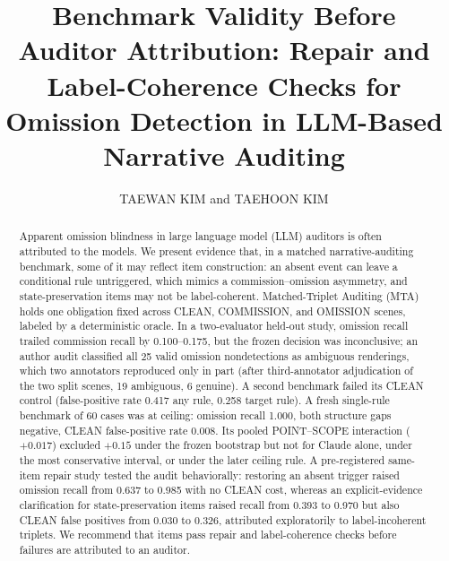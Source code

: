 \documentclass{ieeeaccess}
\begin{document}
\history{}
\doi{}
\title{Benchmark Validity Before Auditor Attribution: Repair and Label-Coherence Checks for Omission Detection in LLM-Based Narrative Auditing}
\author{\uppercase{Taewan Kim} and \uppercase{Taehoon Kim}}
\address[1]{Graduate School of Virtual Convergence, Sogang University, Seoul 04107, Republic of Korea}

\begin{abstract}
Apparent omission blindness in large language model (LLM) auditors is often attributed to the models. We present evidence that, in a matched narrative-auditing benchmark, some of it may reflect item construction: an absent event can leave a conditional rule untriggered, which mimics a commission--omission asymmetry, and state-preservation items may not be label-coherent. Matched-Triplet Auditing (MTA) holds one obligation fixed across CLEAN, COMMISSION, and OMISSION scenes, labeled by a deterministic oracle. In a two-evaluator held-out study, omission recall trailed commission recall by 0.100--0.175, but the frozen decision was inconclusive; an author audit classified all 25 valid omission nondetections as ambiguous renderings, which two annotators reproduced only in part (after third-annotator adjudication of the two split scenes, 19 ambiguous, 6 genuine). A second benchmark failed its CLEAN control (false-positive rate 0.417 any rule, 0.258 target rule). A fresh single-rule benchmark of 60 cases was at ceiling: omission recall 1.000, both structure gaps negative, CLEAN false-positive rate 0.008. Its pooled POINT--SCOPE interaction ($+0.017$) excluded $+0.15$ under the frozen bootstrap but not for Claude alone, under the most conservative interval, or under the later ceiling rule. A pre-registered same-item repair study tested the audit behaviorally: restoring an absent trigger raised omission recall from 0.637 to 0.985 with no CLEAN cost, whereas an explicit-evidence clarification for state-preservation items raised recall from 0.393 to 0.970 but also CLEAN false positives from 0.030 to 0.326, attributed exploratorily to label-incoherent triplets. We recommend that items pass repair and label-coherence checks before failures are attributed to an auditor.
\end{abstract}
\end{document}
